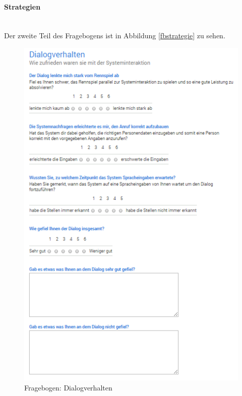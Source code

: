 \documentclass[12pt,a4paper]{scrartcl}
\begin{document}
\paragraph{Strategien}
~\\
Der zweite Teil des Fragebogens ist in Abbildung \ref{fbstrategie} zu sehen. 
\begin{figure}[htbp]
\begin{center}
\includegraphics[width=12cm]{fbdialog.png}
\caption{Fragebogen: Dialogverhalten}
\label{fbstrategien}
\end{center}
\end{figure}
\end{document}
